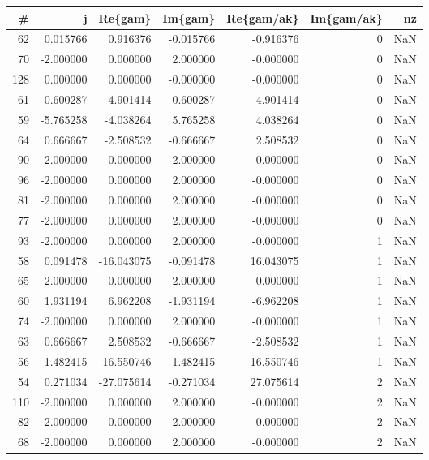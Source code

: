 \begin{tabular}{rrrrrrr}
\toprule
  \# &         j &     Re\{gam\} &   Im\{gam\} &  Re\{gam/ak\} &  Im\{gam/ak\} &  nz \\
\midrule
 62 &  0.015766 &    0.916376 & -0.015766 &   -0.916376 &           0 & NaN \\
 70 & -2.000000 &    0.000000 &  2.000000 &   -0.000000 &           0 & NaN \\
128 &  0.000000 &    0.000000 & -0.000000 &   -0.000000 &           0 & NaN \\
 61 &  0.600287 &   -4.901414 & -0.600287 &    4.901414 &           0 & NaN \\
 59 & -5.765258 &   -4.038264 &  5.765258 &    4.038264 &           0 & NaN \\
 64 &  0.666667 &   -2.508532 & -0.666667 &    2.508532 &           0 & NaN \\
 90 & -2.000000 &    0.000000 &  2.000000 &   -0.000000 &           0 & NaN \\
 96 & -2.000000 &    0.000000 &  2.000000 &   -0.000000 &           0 & NaN \\
 81 & -2.000000 &    0.000000 &  2.000000 &   -0.000000 &           0 & NaN \\
 77 & -2.000000 &    0.000000 &  2.000000 &   -0.000000 &           0 & NaN \\
 93 & -2.000000 &    0.000000 &  2.000000 &   -0.000000 &           1 & NaN \\
 58 &  0.091478 &  -16.043075 & -0.091478 &   16.043075 &           1 & NaN \\
 65 & -2.000000 &    0.000000 &  2.000000 &   -0.000000 &           1 & NaN \\
 60 &  1.931194 &    6.962208 & -1.931194 &   -6.962208 &           1 & NaN \\
 74 & -2.000000 &    0.000000 &  2.000000 &   -0.000000 &           1 & NaN \\
 63 &  0.666667 &    2.508532 & -0.666667 &   -2.508532 &           1 & NaN \\
 56 &  1.482415 &   16.550746 & -1.482415 &  -16.550746 &           1 & NaN \\
 54 &  0.271034 &  -27.075614 & -0.271034 &   27.075614 &           2 & NaN \\
110 & -2.000000 &    0.000000 &  2.000000 &   -0.000000 &           2 & NaN \\
 82 & -2.000000 &    0.000000 &  2.000000 &   -0.000000 &           2 & NaN \\
 68 & -2.000000 &    0.000000 &  2.000000 &   -0.000000 &           2 & NaN \\

\end{tabular}
